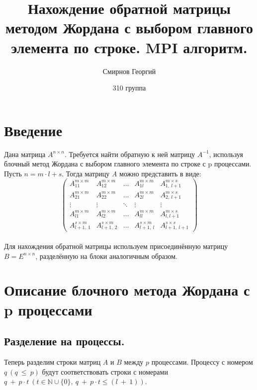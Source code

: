 \documentclass[14pt,a4paper, openany]{article}
\begin{document}
\title{\textbf{Нахождение обратной матрицы методом Жордана с выбором главного элемента по строке. MPI алгоритм.}}
\author{Смирнов Георгий}
\date{310 группа}
\maketitle

\section{Введение}
\indent Дана матрица $A^{n \times n}$. Требуется найти обратную к ней матрицу $A^{-1}$, используя блочный метод Жордана с выбором главного элемента по строке с p процессами.
  Пусть $n = m \cdot l + s$. Тогда матрицу \textit{A} можно представить в виде:
$$
\left (
\begin{matrix} 
A_{11}^{m \times m} & A_{12}^{m \times m} & \ldots & A_{1l}^{m \times m} & A_{1,\ l+1}^{m \times s} \\
A_{21}^{m \times m} & A_{22}^{m \times m} & \ldots & A_{2l}^{m \times m} & A_{2,\ l+1}^{m \times s} \\
\vdots  & \vdots & \ddots & \vdots & \vdots \\
A_{l1}^{m \times m} & A_{l2}^{m \times m} & \ldots & A_{ll}^{m \times m} & A_{l, l+1}^{m \times s} \\
A_{l+1,\ 1}^{s \times m} & A_{l+1,\ 2}^{s \times m} & \ldots & A_{l+1,\ l}^{s \times m} & A_{l+1,\ l+1}^{s \times s}
\end{matrix}
\right )
$$ \\
Для нахождения обратной матрицы используем присоединённую матрицу $ B = E^{n \times n} $, разделённую на блоки аналогичным образом.
\section{Описание блочного метода Жордана с p процессами}
\subsection{Разделение на процессы.}
Теперь разделим строки матриц $A$ и $B$ между $p$ процессами. Процессу с номером $q\ (q\ \leq\ p)$ будут соответствовать строки с номерами
$q\ +\ p\cdot t\ (t \in \mathbb{N}\cup \{ 0\} ,\ q\ +\ p\cdot t \leq (l\ +\ 1))$.
\end{document}
